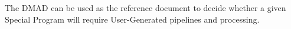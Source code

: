 The DMAD can be used as the reference document to decide whether a given Special Program will require User-Generated pipelines and processing.





